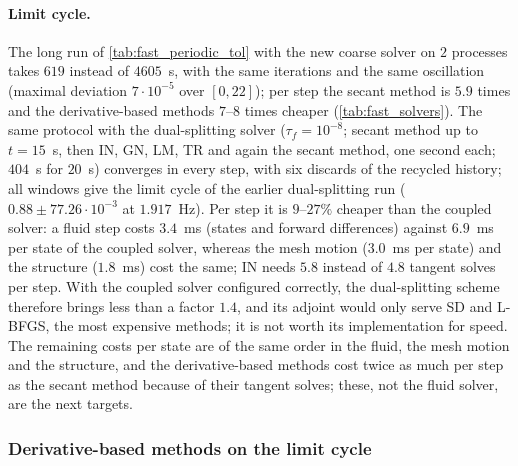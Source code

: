 \documentclass[11pt,a4paper]{article}
\theoremstyle{definition}
\theoremstyle{remark}
\begin{document}
\paragraph{Limit cycle.} The long run of \cref{tab:fast_periodic_tol} with the new coarse solver
on $2$ processes takes $619$ instead of $4605$~s, with the same iterations and the same oscillation
(maximal deviation $7\cdot10^{-5}$ over $[0,22]$); per step the secant method is $5.9$ times and
the derivative-based methods $7$--$8$ times cheaper (\cref{tab:fast_solvers}). The same protocol
with the dual-splitting solver ($\tau_f=10^{-8}$; secant method up to $t=15$~s, then IN, GN, LM, TR
and again the secant method, one second each; $404$~s for $20$~s) converges in every step, with six
discards of the recycled history; all windows give the limit cycle of the earlier dual-splitting run
($0.88\pm77.26\cdot10^{-3}$ at $1.917$~Hz). Per step it is $9$--$27\%$ cheaper than the coupled
solver: a fluid step costs $3.4$~ms (states and forward differences) against $6.9$~ms per state
of the coupled solver, whereas the mesh motion ($3.0$~ms per state) and the structure ($1.8$~ms)
cost the same; IN needs $5.8$ instead of $4.8$ tangent solves per step. With the coupled solver configured correctly, the dual-splitting scheme therefore brings
less than a factor $1.4$, and its adjoint would only serve SD and L-BFGS, the most expensive
methods; it is not worth its implementation for speed. The remaining costs per state are of the same
order in the fluid, the mesh motion and the structure, and the derivative-based methods cost twice
as much per step as the secant method because of their tangent solves; these, not the fluid solver,
are the next targets.

\subsubsection{Derivative-based methods on the limit cycle}\label{sec:fast_derivatives}
\end{document}
